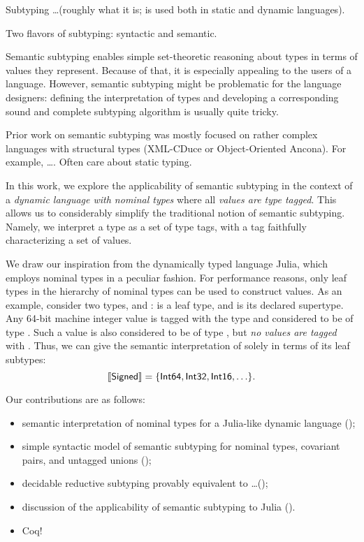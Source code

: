 Subtyping \ldots (roughly what it is; is used both in static and dynamic
languages).

Two flavors of subtyping: syntactic and semantic. 

Semantic subtyping enables simple set-theoretic reasoning about types
in terms of values they represent.
Because of that, it is especially appealing to the users of a language.
However, semantic subtyping might be problematic for the language designers:
defining the interpretation of types and developing a corresponding
sound and complete subtyping algorithm is usually quite tricky.

Prior work on semantic subtyping was mostly focused on rather complex languages
with structural types (XML-CDuce or Object-Oriented Ancona).
For example, \ldots. Often care about static typing.

In this work, we explore the applicability of semantic subtyping in the context
of a \emph{dynamic language with nominal types} 
where all \emph{values are type tagged}. 
This allows us to considerably simplify the traditional notion 
of semantic subtyping.
Namely, we interpret a type as a set of type tags, 
with a tag faithfully characterizing a set of values.

We draw our inspiration from the dynamically typed language Julia,
which employs nominal types in a peculiar fashion. For performance reasons, 
only leaf types in the hierarchy of nominal types
can be used to construct values.
As an example, consider two types,  and :
 is a leaf type, 
and  is its declared supertype.
Any 64-bit machine integer value is tagged with the type 
and considered to be of type .
Such a value is also considered to be of type ,
but \emph{no values are tagged} with .
Thus, we can give the semantic interpretation of 
solely in terms of its leaf subtypes:
\[
\llbracket \mathsf{Signed} \rrbracket = \{\mathsf{Int64}, \mathsf{Int32}, \mathsf{Int16}, \ldots\}.
\]

Our contributions are as follows:
\begin{itemize}
  \item semantic interpretation of nominal types for a Julia-like 
    dynamic language ();
  \item simple syntactic model of semantic subtyping for nominal types,
    covariant pairs, and untagged unions ();
  \item decidable reductive subtyping provably equivalent to \ldots ();
  \item discussion of the applicability of semantic subtyping to Julia ().
  \item Coq!
\end{itemize}

